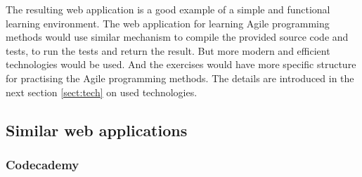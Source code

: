 The resulting web application is a good example of a simple and functional learning environment. The web application for learning Agile programming methods would use similar mechanism to compile the provided source code and tests, to run the tests and return the result. But more modern and efficient technologies would be used. And the exercises would have more specific structure for practising the Agile programming methods. The details are introduced in the next section \ref{sect:tech} on used technologies.










\subsection{Similar web applications}

\subsubsection{Codecademy}

